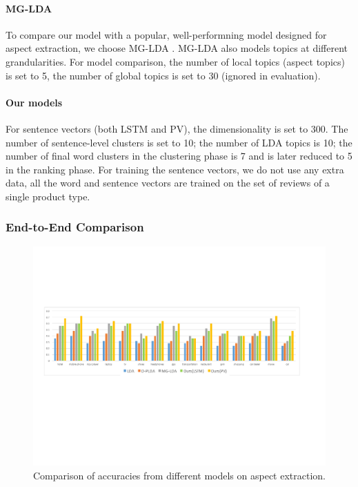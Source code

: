 \paragraph{MG-LDA}
To compare our model with a popular, well-performning model designed for aspect extraction, 
we choose MG-LDA \cite{titov2008modeling}. 
MG-LDA also models topics at different grandularities. 
For model comparison, the number of local topics (aspect topics) is set to 5, 
the number of global topics is set to 30 (ignored in evaluation).

\paragraph{Our models}
For sentence vectors (both LSTM and PV), the dimensionality is set to 300. The number of sentence-level clusters is set to 10; the number of LDA topics is 10; the number of final word clusters in the clustering phase is 7 and is later reduced to 5 in the ranking phase. For training the sentence vectors, we do not use any extra data, all the word and sentence vectors are trained on the set of reviews of a single product type.

\subsubsection{End-to-End Comparison}

\begin{figure}[t!]
\centering
\includegraphics[width=2.0\columnwidth]{figures/results}
\caption{Comparison of accuracies from different models on aspect extraction.}
\label{fig:results}
\end{figure}

